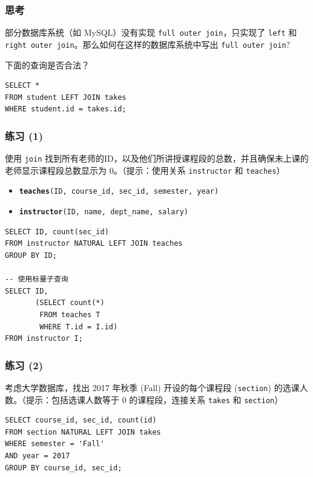 \documentclass[aspectratio=169, 14pt]{beamer}
\begin{document}
\begin{frame}[fragile]
	\frametitle{思考}

	{\large {}}  部分数据库系统（如 MySQL）没有实现 \texttt{full outer join}，只实现了 \texttt{left} 和 \texttt{right outer join}。那么如何在这样的数据库系统中写出 \texttt{full outer join}?

	{\large {}} 下面的查询是否合法？

	\begin{verbatim}
SELECT * 
FROM student LEFT JOIN takes
WHERE student.id = takes.id;
    \end{verbatim}

\end{frame}

\begin{frame}
	\frametitle{练习 (1)}
	{\large {}}  使用 \texttt{join} 找到所有老师的ID，以及他们所讲授课程段的总数，并且确保未上课的老师显示课程段总数显示为 0。（提示：使用关系 \texttt{instructor} 和 \texttt{teaches}）

	\begin{itemize}
		\item \texttt{\textbf{teaches}(ID, course\_id, sec\_id, semester, year)}
		\item \texttt{\textbf{instructor}(ID, name, dept\_name, salary)}
	\end{itemize}

\end{frame}

\begin{frame}[fragile]

	\begin{verbatim}
SELECT ID, count(sec_id)
FROM instructor NATURAL LEFT JOIN teaches
GROUP BY ID;

-- 使用标量子查询
SELECT ID,
       (SELECT count(*)
        FROM teaches T
        WHERE T.id = I.id)
FROM instructor I;
    \end{verbatim}
\end{frame}

\begin{frame}[fragile]
	\frametitle{练习 (2)}
	{\large {}}
	考虑大学数据库，找出 2017 年秋季 (Fall) 开设的每个课程段 (\texttt{section}) 的选课人数。（提示：包括选课人数等于 0 的课程段，连接关系 \texttt{takes} 和 \texttt{section}）

	\pause
	\begin{verbatim}
SELECT course_id, sec_id, count(id)
FROM section NATURAL LEFT JOIN takes
WHERE semester = 'Fall'
AND year = 2017
GROUP BY course_id, sec_id;
    \end{verbatim}


\end{frame}
\end{document}

